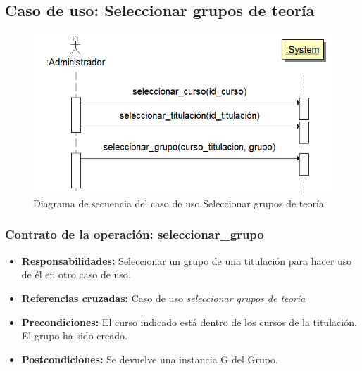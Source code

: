 \documentclass{book}
\begin{document}
\subsection{Caso de uso: Seleccionar grupos de teoría}
\begin{figure}[H] 
  \label{comportamiento-seleccionar-grupos} 
	\begin{center}
    \includegraphics[scale=0.5]{./secuencia-seleccionar-grupo.png}
  \end{center}
\caption{Diagrama de secuencia del caso de uso Seleccionar grupos de teoría}
\end{figure}

\subsubsection{Contrato de la operación: seleccionar\_grupo}
\begin{itemize}
\item {\bf Responsabilidades:} Seleccionar un grupo de una titulación para hacer uso de él en otro caso de uso.
\item {\bf Referencias cruzadas:} Caso de uso {\em seleccionar grupos de teoría}
\item {\bf Precondiciones:} El curso indicado está dentro de los cursos de la titulación.
\\El grupo ha sido creado.
\item {\bf Postcondiciones:} Se devuelve una instancia G del Grupo.
\end{itemize}
\end{document}

